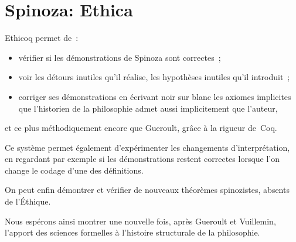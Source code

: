 \documentclass[12pt]{report}
\begin{document}

\begin{coqdoccode}
\end{coqdoccode}
\section{Spinoza: Ethica}



 Ethicoq permet de : 



\begin{itemize}
\item  vérifier si les démonstrations de Spinoza sont correctes ;



\item  voir les détours inutiles qu'il réalise, les hypothèses inutiles qu'il
  introduit ;



\item  corriger ses démonstrations en écrivant noir sur blanc les axiomes
  implicites que l'historien de la philosophie admet aussi implicitement
  que l'auteur,

\end{itemize}
et ce plus méthodiquement encore que Gueroult, grâce à la rigueur
de Coq. 


Ce système permet également d'expérimenter les changements
d'interprétation, en regardant par exemple si les démonstrations restent
correctes lorsque l'on change le codage d'une des définitions. 


On peut enfin démontrer et vérifier de nouveaux théorèmes spinozistes,
absents de l'Éthique.


Nous espérons ainsi montrer une nouvelle fois, après Gueroult et
Vuillemin, l'apport des sciences formelles à l'histoire structurale de
la philosophie.
\end{document}
